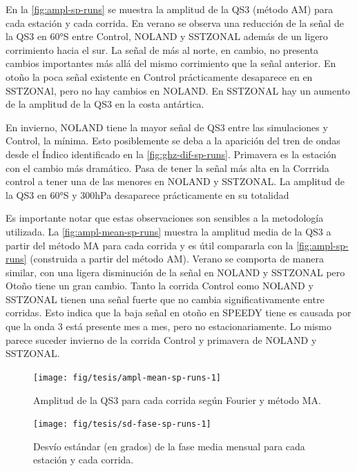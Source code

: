 \documentclass[spanish,a4paper,12pt,oneside]{book}
\begin{document}
En la \autoref{fig:ampl-sp-runs} se muestra la amplitud de la QS3
(método AM) para cada estación y cada corrida. En verano se observa una
reducción de la señal de la QS3 en 60°S entre Control, NOLAND y SSTZONAL
además de un ligero corrimiento hacia el sur. La señal de más al norte,
en cambio, no presenta cambios importantes más allá del mismo
corrimiento que la señal anterior. En otoño la poca señal existente en
Control prácticamente desaparece en en SSTZONAl, pero no hay cambios en
NOLAND. En SSTZONAL hay un aumento de la amplitud de la QS3 en la costa
antártica.

En invierno, NOLAND tiene la mayor señal de QS3 entre las simulaciones y
Control, la mínima. Esto posiblemente se deba a la aparición del tren de
ondas desde el Índico identificado en la \autoref{fig:ghz-dif-sp-runs}.
Primavera es la estación con el cambio más dramático. Pasa de tener la
señal más alta en la Corrrida control a tener una de las menores en
NOLAND y SSTZONAL. La amplitud de la QS3 en 60°S y 300hPa desaparece
prácticamente en su totalidad

Es importante notar que estas observaciones son sensibles a la
metodología utilizada. La \autoref{fig:ampl-mean-sp-runs} muestra la
amplitud media de la QS3 a partir del método MA para cada corrida y es
útil compararla con la \autoref{fig:ampl-sp-runs} (construida a partir
del método AM). Verano se comporta de manera similar, con una ligera
disminución de la señal en NOLAND y SSTZONAL pero Otoño tiene un gran
cambio. Tanto la corrida Control como NOLAND y SSTZONAL tienen una señal
fuerte que no cambia significativamente entre corridas. Esto indica que
la baja señal en otoño en SPEEDY tiene es causada por que la onda 3 está
presente mes a mes, pero no estacionariamente. Lo mismo parece suceder
invierno de la corrida Control y primavera de NOLAND y SSTZONAL.

\begin{landscape}\begin{figure}

{\centering \texttt{[image: fig/tesis/ampl-mean-sp-runs-1]} 

}

\caption{Amplitud de la QS3 para cada corrida según Fourier y método MA.}\label{fig:ampl-mean-sp-runs}
\end{figure}
\end{landscape}

\begin{figure}
\texttt{[image: fig/tesis/sd-fase-sp-runs-1]} \caption{Desvío estándar (en grados) de la fase media mensual para cada estación y cada corrida.}\label{fig:sd-fase-sp-runs}
\end{figure}
\end{document}
